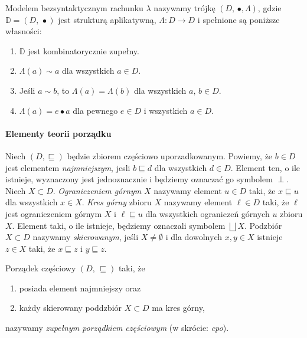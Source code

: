 \begin{definicja}%
  Modelem bezsyntaktycznym rachunku \(\lambda\) nazywamy trójkę \((D,\,\bullet, \Lambda)\), gdzie \(\mathbb{D}=(D,\,\bullet)\) jest strukturą aplikatywną, \(\Lambda: D \to D\) i spełnione są poniższe własności:
  \begin{enumerate}[label={(\alph*)}, ref={(\alph*)}]
  \setlength\itemsep{0em}
    \item \(\mathbb{D}\) jest kombinatorycznie zupełny.
    \item \(\Lambda (a) \sim a\) dla wszystkich \(a\in D\).
    \item Jeśli \(a\sim b\), to \(\Lambda(a) = \Lambda(b)\) dla wszystkich \(a,\,b\in D\).
    \item \(\Lambda(a)=e\bullet a\) dla pewnego \(e\in D\) i wszystkich \(a\in D\).
  \end{enumerate}
\end{definicja}

\paragraph{Elementy teorii porządku} 
Niech \((D,\sqsubseteq)\) będzie zbiorem częściowo uporzadkowanym. Powiemy, że \(b\in D\) jest elementem \emph{najmniejszym}, jesli \(b\sqsubseteq d\) dla wszystkich \(d\in D\). Element ten, o ile istnieje, wyznaczony jest jednoznacznie i będziemy oznaczać go symbolem \(\perp\). Niech \(X\subset D\). \emph{Ograniczeniem górnym} \(X\) nazywamy element \(u\in D\) taki, że \(x\sqsubseteq u\) dla wszystkich \(x\in X\). \emph{Kres górny} zbioru \(X\) nazywamy element \(\ell\in D\) taki, że \(\ell\) jest ograniczeniem górnym \(X\) i \(\ell\sqsubseteq u\) dla wszystkich ograniczeń górnych \(u\) zbioru \(X\). Element taki, o ile istnieje, będziemy oznaczali symbolem \(\bigsqcup X\). Podzbiór \(X\subset D\) nazywamy \emph{skierowanym}, jeśli \(X\neq\emptyset\) i dla dowolnych \(x, y\in X\) istnieje \(z\in X\) taki, że \(x\sqsubseteq z\) i \(y\sqsubseteq z\). 

\begin{definicja}%
Porządek częściowy \((D,\,\sqsubseteq)\) taki, że
\begin{enumerate}[label={(\alph*)}, ref={(\alph*)}]
  \setlength\itemsep{0em}
  \item posiada element najmniejszy oraz
  \item każdy skierowany poddzbiór \(X\subset D\) ma kres górny,
\end{enumerate}
  nazywamy \emph{zupełnym porządkiem częściowym} (w skrócie: \emph{cpo}).
\end{definicja}

